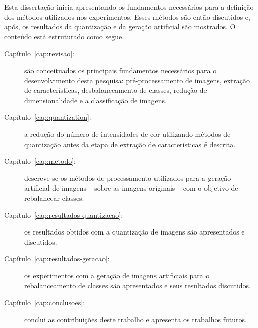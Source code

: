 Esta dissertação inicia apresentando os fundamentos necessários para a definição dos métodos utilizados nos experimentos. Esses métodos são então discutidos e, após, os resultados da quantização e da geração artificial são mostrados. O conteúdo está estruturado como segue.

\begin{description}
\item [Capítulo~\ref{cap:revisao}:] são conceituados os principais fundamentos necessários para o desenvolvimento desta pesquisa: pré-processamento de imagens, extração de características, desbalanceamento de classes, redução de dimensionalidade e a classificação de imagens.

\item [Capítulo~\ref{cap:quantization}:] a redução do número de intensidades de cor utilizando métodos de quantização antes da etapa de extração de características é descrita.

\item [Capítulo~\ref{cap:metodo}:] descreve-se os métodos de processamento utilizados para a geração artificial de imagens -- sobre as imagens originais -- com o objetivo de rebalancear classes.

\item [Capítulo~\ref{cap:resultados-quantizacao}:] os resultados obtidos com a quantização de imagens são apresentados e discutidos.

\item [Capítulo~\ref{cap:resultados-geracao}:] os experimentos com a geração de imagens artificiais para o rebalanceamento de classes são apresentados e seus resultados discutidos.

\item [Capítulo~\ref{cap:conclusoes}:] conclui as contribuições deste trabalho e apresenta os trabalhos futuros.

\end{description}

